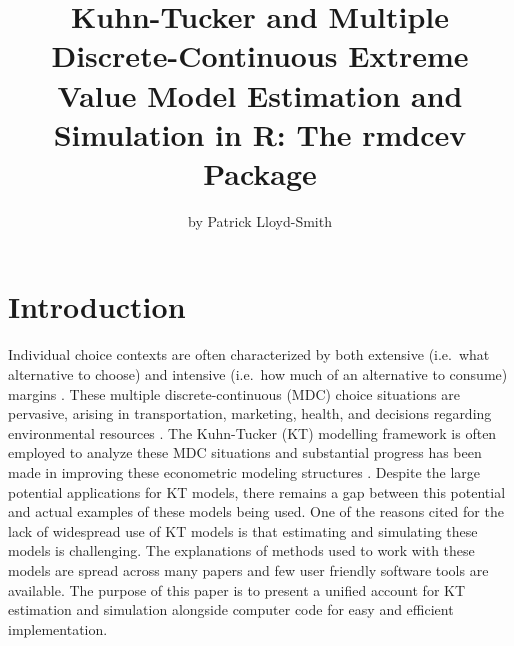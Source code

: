 \title{Kuhn-Tucker and Multiple Discrete-Continuous Extreme Value Model
Estimation and Simulation in R: The rmdcev Package}
\author{by Patrick Lloyd-Smith}

\maketitle


\hypertarget{introduction}{%
\section{Introduction}\label{introduction}}

Individual choice contexts are often characterized by both extensive
(i.e.~what alternative to choose) and intensive (i.e.~how much of an
alternative to consume) margins \citep{bhatmultiple2008}. These multiple
discrete-continuous (MDC) choice situations are pervasive, arising in
transportation, marketing, health, and decisions regarding environmental
resources \citep{bhatmultiple2014}. The Kuhn-Tucker (KT) modelling
framework is often employed to analyze these MDC situations and
substantial progress has been made in improving these econometric
modeling structures \citep{vonhaefenkuhn-tucker2005, bhatmultiple2014}.
Despite the large potential applications for KT models, there remains a
gap between this potential and actual examples of these models being
used. One of the reasons cited for the lack of widespread use of KT
models is that estimating and simulating these models is challenging.
The explanations of methods used to work with these models are spread
across many papers and few user friendly software tools are available.
The purpose of this paper is to present a unified account for KT
estimation and simulation alongside computer code for easy and efficient
implementation.


